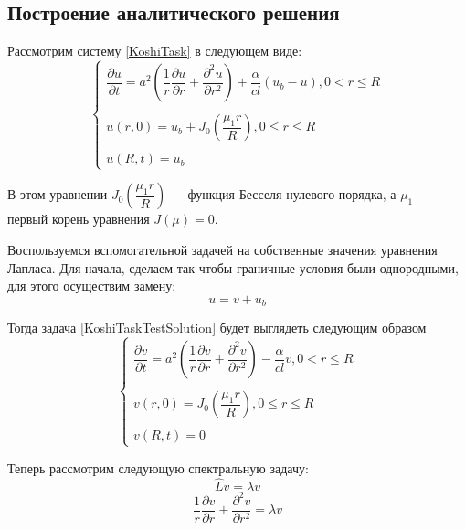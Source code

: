 \documentclass[a4paper,14pt,russian, fleqn]{extreport}
\begin{document}
	\subsection{Построение аналитического решения}
	Рассмотрим систему \eqref{KoshiTask} в следующем виде:
	\begin{equation}\label{KoshiTaskTestSolution}
		\left \{\begin{array}{l}
		\dfrac{\partial u}{\partial t} = a^2 \left ( \dfrac{1}{r}\dfrac{\partial u}{\partial r} + \dfrac{\partial^2 u}{\partial r^2}\right ) + \dfrac{\alpha}{cl}(u_b - u), 0 < r \leq R\\
		\\
		u(r, 0) = u_b + J_0\left(\dfrac{\mu_1 r}{R}\right), 0 \leq r \leq R \\
		\\
		u(R, t) = u_b
		\end{array}\right.
	\end{equation}
	
	В этом уравнении $J_0 \left ( \dfrac{\mu_1 r}{R} \right)$ --- функция Бесселя нулевого порядка, а $\mu_1$ --- первый корень уравнения $J \left( \mu \right) = 0$.
	
	Воспользуемся вспомогательной задачей на собственные значения уравнения Лапласа. Для начала, сделаем так чтобы граничные условия были однородными, для этого осуществим замену:
	\begin{equation*}
	u = v + u_b
	\end{equation*}
	
	Тогда задача \eqref{KoshiTaskTestSolution} будет выглядеть следующим образом
	\begin{equation}\label{KoshiTaskTestSolutionUniform}
	\left \{\begin{array}{l}
	\dfrac{\partial v}{\partial t} = a^2 \left ( \dfrac{1}{r}\dfrac{\partial v}{\partial r} + \dfrac{\partial^2 v}{\partial r^2}\right ) - \dfrac{\alpha}{cl}v, 0 < r \leq R\\
	\\
	v(r, 0) = J_0\left(\dfrac{\mu_1 r}{R}\right), 0 \leq r \leq R \\
	\\
	v(R, t) = 0
	\end{array}\right.
	\end{equation}
	
	Теперь рассмотрим следующую спектральную задачу:
	\begin{equation*}
	\hat{L}v = \lambda v
	\end{equation*}
	\begin{equation*}
	\dfrac{1}{r}\dfrac{\partial v}{\partial r} + \dfrac{\partial^2 v}{\partial r^2} = \lambda v
	\end{equation*}
	
\end{document}
